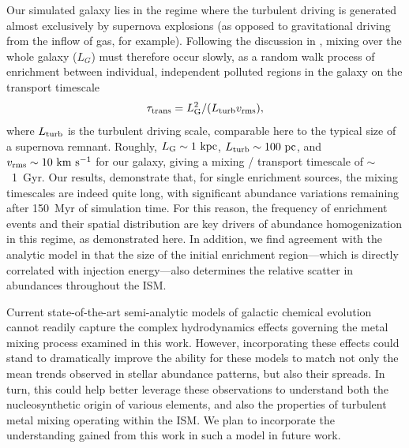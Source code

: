 \documentclass[twocolumn]{aastex62}
\begin{document}
Our simulated galaxy lies in the regime where the turbulent driving is generated almost exclusively by supernova explosions (as opposed to gravitational driving from the inflow of gas, for example). Following the discussion in \cite{PanScannapiecoScalo2013}, mixing over the whole galaxy ($L_G$) must therefore occur slowly, as a random walk process of enrichment between individual, independent polluted regions in the galaxy on the transport timescale \begin{equation} \tau_{\rm trans} = L_{\rm G}^2 / (L_{\rm turb}v_{\rm rms}), \end{equation} 
where $L_{\rm turb}$ is the turbulent driving scale, comparable here to the typical size of a supernova remnant. Roughly, $L_{\rm G} \sim 1~{\rm kpc}$, $L_{\rm turb} \sim 100~{\rm pc}$, and $v_{\rm rms} \sim 10~{\rm km}~{\rm s}^{-1}$ for our galaxy, giving a mixing / transport timescale of $\sim$~1~Gyr. Our results, demonstrate that, for single enrichment sources, the mixing timescales are indeed quite long, with significant abundance variations remaining after 150~Myr of simulation time. For this reason, the frequency of enrichment events and their spatial distribution are key drivers of abundance homogenization in this regime, as demonstrated here. In addition, we find agreement with the analytic model in \cite{KrumholzTing2018} that the size of the initial enrichment region---which is directly correlated with injection energy---also determines the relative scatter in abundances throughout the ISM.

Current state-of-the-art semi-analytic models of galactic chemical evolution cannot readily capture the complex hydrodynamics effects governing the metal mixing process examined in this work. However, incorporating these effects could stand to dramatically improve the ability for these models to match not only the mean trends observed in stellar abundance patterns, but also their spreads. In turn, this could help better leverage these observations to understand both the nucleosynthetic origin of various elements, and also the properties of turbulent metal mixing operating within the ISM. We plan to incorporate the understanding gained from this work in such a model in future work.

\end{document}
